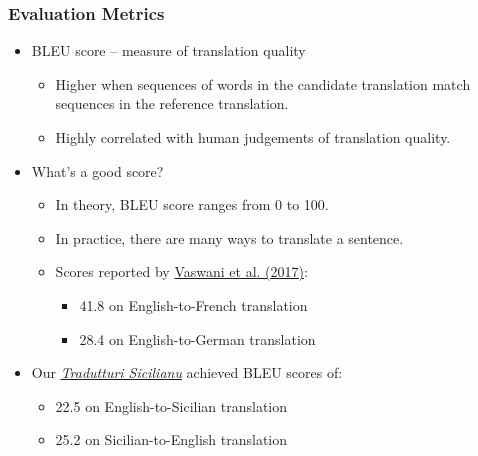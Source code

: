 \documentclass{beamer}
\begin{document}
\begin{frame}
  \frametitle{Evaluation Metrics}
  \vspace{-1.0em}
  \begin{itemize}
  \item BLEU score -- measure of translation quality
    \begin{itemize}
    \item Higher when sequences of words in the candidate translation match sequences in the reference translation.
    \item Highly correlated with human judgements of translation quality.
    \end{itemize} 
    \vspace{0.5em}
  \item What's a good score?
    \begin{itemize}
    \item In theory, BLEU score ranges from 0 to 100.
    \item In practice, there are many ways to translate a sentence.
    \item Scores reported by \href{https://arxiv.org/abs/1706.03762}{Vaswani et al. (2017)}:
      \begin{itemize} 
      \item 41.8 on English-to-French translation
      \item 28.4 on English-to-German translation
      \end{itemize} 
    \end{itemize} 
    \vspace{0.5em}
  \item Our \href{https://translate.napizia.com}{\textit{Tradutturi Sicilianu}} achieved BLEU scores of:
    \begin{itemize}
    \item 22.5 on English-to-Sicilian translation
    \item 25.2 on Sicilian-to-English translation
    \end{itemize} 
  \end{itemize} 
\end{frame}

\end{document}
